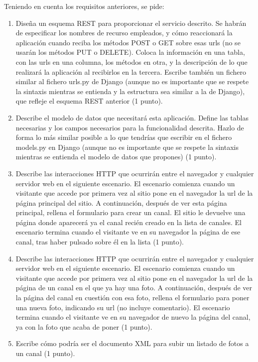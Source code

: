 Teniendo en cuenta los requisitos anteriores, se pide:

\begin{enumerate}
\item Diseña un esquema REST para proporcionar el servicio descrito. Se habrán de especificar los nombres de recurso empleados, y cómo reaccionará la aplicación cuando reciba los métodos POST o GET sobre esas urls (no se usarán los métodos PUT o DELETE). Coloca la información en una tabla, con las urls en una columna, los métodos en otra, y la descripción de lo que realizará la aplicación al recibirlos en la tercera. Escribe también un fichero similar al fichero urls.py de Django (aunque no es importante que se respete la sintaxis mientras se entienda y la estructura sea similar a la de Django), que refleje el esquema REST anterior (1 punto).

\item Describe el modelo de datos que necesitará esta aplicación. Define las tablas necesarias y los campos necesarios para la funcionalidad descrita. Hazlo de forma lo más similar posible a lo que tendrías que escribir en el fichero models.py en Django (aunque no es importante que se respete la sintaxis mientras se entienda el modelo de datos que propones) (1 punto).

\item Describe las interacciones HTTP que ocurrirán entre el navegador y cualquier servidor web en el siguiente escenario. El escenario comienza cuando un visitante que accede por primera vez al sitio pone en el navegador la url de la página principal del sitio. A continuación, después de ver esta página principal, rellena el formulario para crear un canal. El sitio le devuelve una página donde aparecerá ya el canal recién creado en la lista de canales. El escenario termina cuando el visitante ve en su navegador la página de ese canal, tras haber pulsado sobre él en la lista (1 punto).

\item Describe las interacciones HTTP que ocurrirán entre el navegador y cualquier servidor web en el siguiente escenario. El escenario comienza cuando un visitante que accede por primera vez al sitio pone en el navegador la url de la página de un canal en el que ya hay una foto. A continuación, después de ver la página del canal en cuestión con esa foto, rellena el formulario para poner una nueva foto, indicando su url (no incluye comentario). El escenario termina cuando el visitante ve en su navegador de nuevo la página del canal, ya con la foto que acaba de poner (1 punto).

\item Escribe cómo podría ser el documento XML para subir un listado de fotos a un canal (1 punto).
\end{enumerate}

